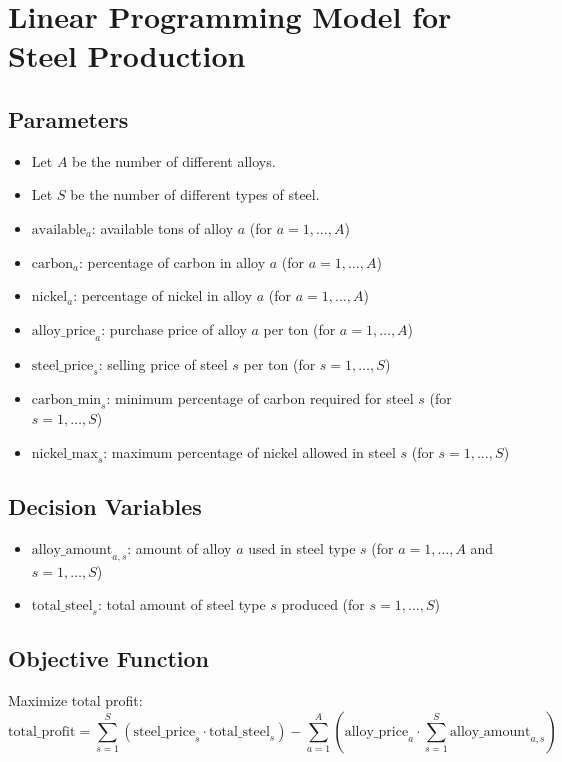 \documentclass{article}
\begin{document}
\section*{Linear Programming Model for Steel Production}

\subsection*{Parameters}
\begin{itemize}
    \item Let \( A \) be the number of different alloys.
    \item Let \( S \) be the number of different types of steel.
    \item \( \text{available}_a \): available tons of alloy \( a \) (for \( a = 1, \ldots, A \))
    \item \( \text{carbon}_a \): percentage of carbon in alloy \( a \) (for \( a = 1, \ldots, A \))
    \item \( \text{nickel}_a \): percentage of nickel in alloy \( a \) (for \( a = 1, \ldots, A \))
    \item \( \text{alloy\_price}_a \): purchase price of alloy \( a \) per ton (for \( a = 1, \ldots, A \))
    \item \( \text{steel\_price}_s \): selling price of steel \( s \) per ton (for \( s = 1, \ldots, S \))
    \item \( \text{carbon\_min}_s \): minimum percentage of carbon required for steel \( s \) (for \( s = 1, \ldots, S \))
    \item \( \text{nickel\_max}_s \): maximum percentage of nickel allowed in steel \( s \) (for \( s = 1, \ldots, S \))
\end{itemize}

\subsection*{Decision Variables}
\begin{itemize}
    \item \( \text{alloy\_amount}_{a,s} \): amount of alloy \( a \) used in steel type \( s \) (for \( a = 1, \ldots, A \) and \( s = 1, \ldots, S \))
    \item \( \text{total\_steel}_s \): total amount of steel type \( s \) produced (for \( s = 1, \ldots, S \))
\end{itemize}

\subsection*{Objective Function}
Maximize total profit:
\[
\text{total\_profit} = \sum_{s=1}^{S} \left( \text{steel\_price}_s \cdot \text{total\_steel}_s \right) - \sum_{a=1}^{A} \left( \text{alloy\_price}_a \cdot \sum_{s=1}^{S} \text{alloy\_amount}_{a,s} \right)
\]
\end{document}

